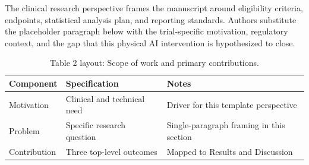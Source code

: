 
The clinical research perspective frames the manuscript around eligibility criteria, endpoints, statistical analysis plan, and reporting standards. Authors substitute the placeholder paragraph below with the trial-specific motivation, regulatory context, and the gap that this physical AI intervention is hypothesized to close.

\begin{table}[H]
\caption{Table 2 layout: Scope of work and primary contributions.}
\label{tab:intro_overview}
\centering
\begin{tabular}{>{\raggedright\arraybackslash}p{3.4cm} >{\raggedright\arraybackslash}p{4.6cm} >{\raggedright\arraybackslash}p{5.4cm}}
\toprule
\textbf{Component} & \textbf{Specification} & \textbf{Notes} \\
\midrule
  Motivation & Clinical and technical need & Driver for this template perspective \\
  Problem & Specific research question & Single-paragraph framing in this section \\
  Contribution & Three top-level outcomes & Mapped to Results and Discussion \\
\bottomrule
\end{tabular}
\end{table}
